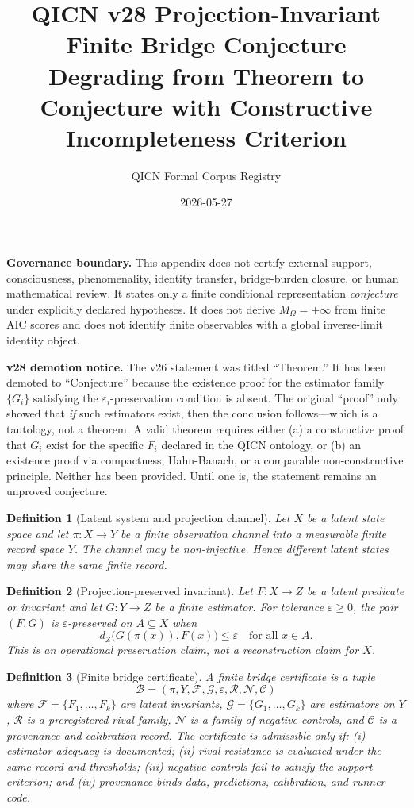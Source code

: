 \documentclass[11pt]{article}
\title{QICN v28 Projection-Invariant Finite Bridge Conjecture\\\large Degrading from Theorem to Conjecture with Constructive Incompleteness Criterion}
\author{QICN Formal Corpus Registry}
\date{2026-05-27}
\newtheorem{definition}{Definition}
\begin{document}
\maketitle

\noindent\textbf{Governance boundary.} This appendix does not certify external support, consciousness, phenomenality, identity transfer, bridge-burden closure, or human mathematical review. It states only a finite conditional representation \emph{conjecture} under explicitly declared hypotheses. It does not derive $M_{\Omega}=+\infty$ from finite AIC scores and does not identify finite observables with a global inverse-limit identity object.

\noindent\textbf{v28 demotion notice.} The v26 statement was titled ``Theorem.'' It has been demoted to ``Conjecture'' because the existence proof for the estimator family $\{G_i\}$ satisfying the $\varepsilon_i$-preservation condition is absent. The original ``proof'' only showed that \emph{if} such estimators exist, then the conclusion follows---which is a tautology, not a theorem. A valid theorem requires either (a) a constructive proof that $G_i$ exist for the specific $F_i$ declared in the QICN ontology, or (b) an existence proof via compactness, Hahn-Banach, or a comparable non-constructive principle. Neither has been provided. Until one is, the statement remains an unproved conjecture.

\begin{definition}[Latent system and projection channel]
Let $X$ be a latent state space and let $\pi:X\to Y$ be a finite observation channel into a measurable finite record space $Y$. The channel may be non-injective. Hence different latent states may share the same finite record.
\end{definition}

\begin{definition}[Projection-preserved invariant]
Let $F:X\to Z$ be a latent predicate or invariant and let $G:Y\to Z$ be a finite estimator. For tolerance $\varepsilon\geq 0$, the pair $(F,G)$ is $\varepsilon$-preserved on $A\subseteq X$ when
\[
d_Z\bigl(G(\pi(x)),F(x)\bigr)\leq \varepsilon \quad \text{for all } x\in A.
\]
This is an operational preservation claim, not a reconstruction claim for $X$.
\end{definition}

\begin{definition}[Finite bridge certificate]
A finite bridge certificate is a tuple
\[
\mathcal{B}=(\pi,Y,\mathcal{F},\mathcal{G},\varepsilon,\mathcal{R},\mathcal{N},\mathcal{C})
\]
where $\mathcal{F}=\{F_1,\ldots,F_k\}$ are latent invariants, $\mathcal{G}=\{G_1,\ldots,G_k\}$ are estimators on $Y$, $\mathcal{R}$ is a preregistered rival family, $\mathcal{N}$ is a family of negative controls, and $\mathcal{C}$ is a provenance and calibration record. The certificate is admissible only if: (i) estimator adequacy is documented; (ii) rival resistance is evaluated under the same record and thresholds; (iii) negative controls fail to satisfy the support criterion; and (iv) provenance binds data, predictions, calibration, and runner code.
\end{definition}
\end{document}
